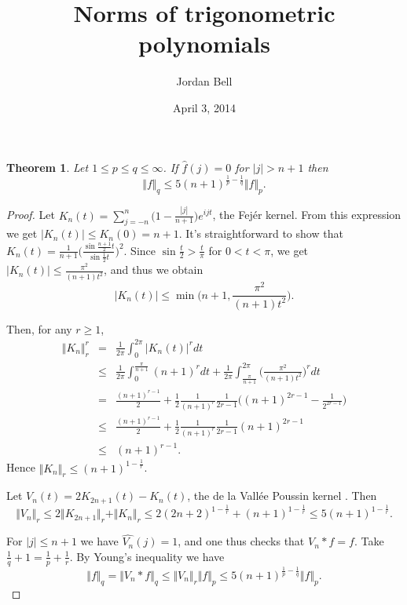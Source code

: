 \documentclass{article}
\newcommand{\norm}[1]{\Vert #1 \Vert}
\newtheorem{theorem}{Theorem}
\begin{document}
\title{Norms of trigonometric polynomials}
\author{Jordan Bell}
\date{April 3, 2014}

\maketitle

\begin{theorem}
Let $1 \leq p \leq q \leq \infty$.
If $\hat{f}(j)=0$ for $|j|>n+1$ then
\[
\norm{f}_q \leq 5(n+1)^{\frac{1}{p}-\frac{1}{q}} \norm{f}_p.
\]
\end{theorem}
\begin{proof}
Let $K_n(t)=\sum_{j=-n}^n \Big(1-\frac{|j|}{n+1}\Big)e^{ijt}$, the Fej\'er kernel.
From this expression we get $|K_n(t)| \leq K_n(0)= n+1$.
 It's straightforward to show
that $K_n(t)=\frac{1}{n+1}\Big(\frac{\sin \frac{n+1}{2}t}{\sin \frac{1}{2}t} \Big)^2$.
Since $\sin \frac{t}{2}>\frac{t}{\pi}$ for $0 < t < \pi$, we get $|K_n(t)| \leq   \frac{\pi^2}{(n+1)t^2}$, and
thus we obtain
\[
|K_n(t)| \leq \min\Big(n+1, \frac{\pi^2}{(n+1)t^2} \Big).
\]

Then, for any $r \geq 1$,
\begin{eqnarray*}
\norm{K_n}_r^r&=&\frac{1}{2\pi} \int_0^{2\pi} |K_n(t)|^r dt\\
&\leq&\frac{1}{2\pi} \int_0^{\frac{\pi}{n+1}} (n+1)^r dt
+\frac{1}{2\pi} \int_{\frac{\pi}{n+1}}^{2\pi} \Big(\frac{\pi^2}{(n+1)t^2}\Big)^r dt\\
&=&\frac{(n+1)^{r-1}}{2} 
+\frac{1}{2}\frac{1}{(n+1)^r}\frac{1}{2r-1}\Big( (n+1)^{2r-1}-\frac{1}{2^{2r-1}}\Big)\\
&\leq&\frac{(n+1)^{r-1}}{2} 
+\frac{1}{2}\frac{1}{(n+1)^r}\frac{1}{2r-1}(n+1)^{2r-1}\\
&\leq&(n+1)^{r-1}.
\end{eqnarray*}
Hence $\norm{K_n}_r \leq (n+1)^{1-\frac{1}{r}}$.

Let $V_n(t)=2K_{2n+1}(t)-K_n(t)$, the de la Vall\'ee Poussin kernel
\cite[p. 16]{katznelson}.
Then
\[
\norm{V_n}_r \leq 2\norm{K_{2n+1}}_r+\norm{K_n}_r \leq 2(2n+2)^{1-\frac{1}{r}}+(n+1)^{1-\frac{1}{r}}
\leq 5(n+1)^{1-\frac{1}{r}}.
\]

For $|j| \leq n+1$ we have $\widehat{V_n}(j)=1$, and one thus checks that $V_n * f=f$. Take $\frac{1}{q}+1=\frac{1}{p}+\frac{1}{r}$.
By
Young's inequality we have 
\[
\norm{f}_q=\norm{V_n * f}_q \leq \norm{V_n}_r \norm{f}_p
\leq 5(n+1)^{\frac{1}{p}-\frac{1}{q}} \norm{f}_p.
\]
\end{proof}



\end{document}
